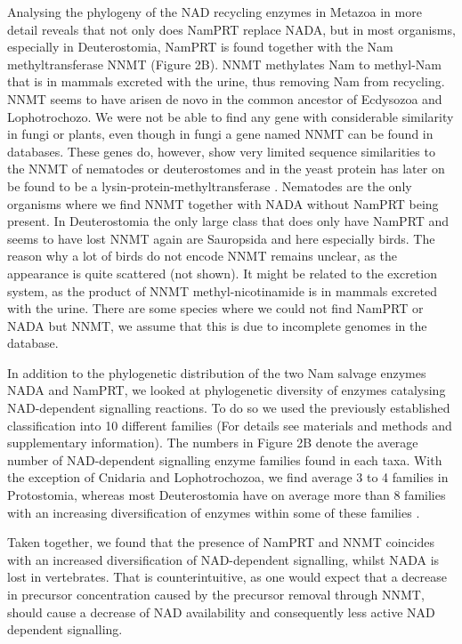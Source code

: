 Analysing the phylogeny of the NAD recycling enzymes in Metazoa in more detail reveals that not only does NamPRT replace NADA, but in most organisms, especially in Deuterostomia, NamPRT is found together with the Nam methyltransferase NNMT (Figure 2B). NNMT methylates Nam to methyl-Nam that is in mammals excreted with the urine, thus removing Nam from recycling. NNMT seems to have arisen de novo in the common ancestor of Ecdysozoa and Lophotrochozo.  We were not be able to find any gene with considerable similarity in fungi or plants, even though in fungi a gene named NNMT can be found in databases. These genes do, however, show very limited sequence similarities to the NNMT of nematodes or deuterostomes and in the yeast protein has later on be found to be a lysin-protein-methyltransferase \cite{Wlodarski2011}. Nematodes are the only organisms where we find NNMT together with NADA without NamPRT being present. In Deuterostomia the only large class that does only have NamPRT and seems to have lost NNMT again are Sauropsida and here especially birds. The reason why a lot of birds do not encode NNMT remains unclear, as the appearance is quite scattered (not shown). It might be related to the excretion system, as the product of NNMT methyl-nicotinamide is in mammals excreted with the urine. There are some species where we could not find NamPRT or NADA but NNMT, we assume that this is due to incomplete genomes in the database.

In addition to the phylogenetic distribution of the two Nam salvage enzymes NADA and NamPRT, we looked at phylogenetic diversity of enzymes catalysing NAD-dependent signalling reactions. To do so we used the previously established classification into 10 different families \cite{Gossmann2012} (For details see materials and methods and supplementary information). The numbers in Figure 2B denote the average number of NAD-dependent signalling enzyme families found in each taxa. With the exception of Cnidaria and Lophotrochozoa, we find average 3 to 4 families in Protostomia, whereas most Deuterostomia have on average more than 8 families with an increasing diversification of enzymes within some of these families \cite{Gossmann2014}.

Taken together, we found that the presence of NamPRT and NNMT coincides with an increased diversification of NAD-dependent signalling, whilst NADA is lost in vertebrates. That is  counterintuitive, as one would expect that a decrease in precursor concentration caused by the precursor removal through NNMT, should cause a decrease of NAD availability and consequently less active NAD dependent signalling.


